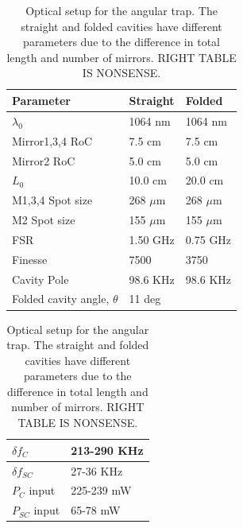 \begin{table}[h]
\begin{tabular}{|l|l|l|}
\hline
Parameter & Straight & Folded \\ \hline
$\lambda_0$ & 1064 nm & 1064 nm \\ \hline
Mirror1,3,4 RoC & 7.5 cm & 7.5 cm \\ \hline
Mirror2 RoC & 5.0 cm & 5.0 cm \\ \hline
$L_0$ & 10.0 cm & 20.0 cm \\ \hline
M1,3,4 Spot size  & 268 $\mu$m & 268 $\mu$m\\ \hline
M2 Spot size  & 155 $\mu$m & 155 $\mu$m\\ \hline
FSR      & 1.50 GHz & 0.75 GHz \\ \hline
Finesse & 7500 & 3750 \\ \hline
Cavity Pole & 98.6 KHz & 98.6 KHz\\ \hline
Folded cavity angle, $\theta$ & 11 deg\\ \hline
\end{tabular}
%
\begin{tabular}{|l|l|}
\hline
$\delta f_{C}$ & 213-290 KHz \\ \hline
$\delta f_{SC}$ & 27-36 KHz \\ \hline
$P_{C}$ input& 225-239 mW \\ \hline
$P_{SC}$ input & 65-78 mW \\ \hline
\end{tabular}
\caption[Angular trap optical parameters]{Optical setup for the angular trap. The straight and folded cavities have different parameters due to the difference in total length and number of mirrors. RIGHT TABLE IS NONSENSE.}
\label{tab:longAngParams}
\end{table}


